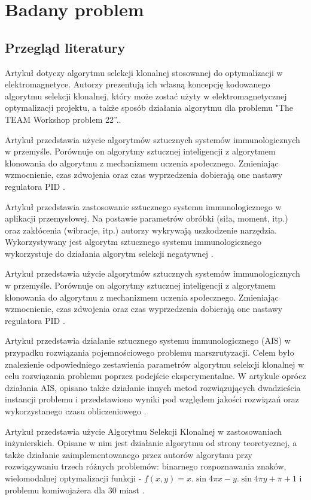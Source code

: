 \documentclass[a4paper]{article}
\begin{document}
\section{Badany problem}
\subsection{Przegląd literatury}
Artykuł dotyczy algorytmu selekcji klonalnej stosowanej do optymalizacji w elektromagnetyce. Autorzy prezentują ich własną koncepcję kodowanego algorytmu selekcji klonalnej, który może zostać użyty w elektromagnetycznej optymalizacji projektu, a także sposób działania algorytmu dla problemu "The TEAM Workshop problem 22”.\cite{1430953}.


Artykuł przedstawia użycie algorytmów sztucznych systemów immunologicznych w przemyśle. Porównuje on algorytmy sztucznej inteligencji z algorytmem klonowania do algorytmu z mechanizmem uczenia społecznego. Zmieniając wzmocnienie, czas zdwojenia oraz czas wyprzedzenia dobierają one nastawy regulatora PID \cite{wang_artificial_2017}.


Artykuł przedstawia zastosowanie sztucznego systemu immunologicznego w aplikacji przemysłowej. Na postawie parametrów obróbki (siła, moment, itp.) oraz zakłócenia (wibracje, itp.) autorzy wykrywają uszkodzenie narzędzia. Wykorzystywany jest algorytm sztucznego systemu immunologicznego wykorzystuje do działania algorytm selekcji negatywnej \cite{dasgupta1999artificial}.


Artykuł przedstawia użycie algorytmów sztucznych systemów immunologicznych w przemyśle. Porównuje on algorytmy sztucznej inteligencji z algorytmem klonowania do algorytmu z mechanizmem uczenia społecznego. Zmieniając wzmocnienie, czas zdwojenia oraz czas wyprzedzenia dobierają one nastawy regulatora PID \cite{wang_artificial_2017}.


Artykuł przedstawia działanie sztucznego systemu immunologicznego (AIS) w przypadku rozwiązania pojemnościowego problemu marszrutyzacji. Celem było znalezienie odpowiedniego zestawienia parametrów algorytmu selekcji klonalnej w celu rozwiązania problemu poprzez podejście eksperymentalne. W artykule oprócz działania AIS, opisano także działanie innych metod rozwiązujących dwadzieścia instancji problemu i przedstawiono wyniki pod względem jakości rozwiązań oraz wykorzystanego czasu obliczeniowego \cite{thapatsuwan}.


Artykuł przedstawia użycie Algorytmu Selekcji Klonalnej w zastosowaniach inżynierskich. Opisane w nim jest działanie algorytmu od strony teoretycznej, a także działanie zaimplementowanego przez autorów algorytmu przy rozwiązywaniu trzech różnych problemów: binarnego rozpoznawania znaków, wielomodalnej optymalizacji funkcji -
$f(x, y) = x.\sin{4 \pi x} - y.\sin{4 \pi y + \pi} + 1$
i problemu komiwojażera dla 30 miast \cite{de_castro}.
\end{document}
